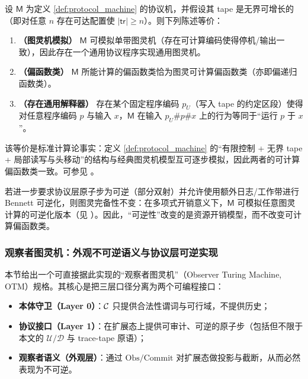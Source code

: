 \begin{theorem}[协议机与图灵机的函数类等价]\label{thm:protocol_machine_equiv_tm}
设 \(\mathsf{M}\) 为定义 \ref{def:protocol_machine} 的协议机，并假设其 tape 是无界可增长的（即对任意 \(n\) 存在可达配置使 \(|\mathsf{tr}|\ge n\)）。则下列陈述等价：
\begin{enumerate}
  \item \textbf{（图灵机模拟）} \(\mathsf{M}\) 可模拟单带图灵机（存在可计算编码使得停机/输出一致），因此存在一个通用协议程序实现通用图灵机。
  \item \textbf{（偏函数类）} \(\mathsf{M}\) 所能计算的偏函数类恰为图灵可计算偏函数类（亦即偏递归函数类）。
  \item \textbf{（存在通用解释器）} 存在某个固定程序编码 \(p_U\)（写入 tape 的约定区段）使得对任意程序编码 \(p\) 与输入 \(x\)，\(\mathsf{M}\) 在输入 \(p_U\#p\#x\) 上的行为等同于“运行 \(p\) 于 \(x\)”。
\end{enumerate}
该等价是标准计算论事实：定义 \ref{def:protocol_machine} 的“有限控制 + 无界 tape + 局部读写与头移动”的结构与经典图灵机模型互可逐步模拟，因此两者的可计算偏函数类一致。可参见 \cite{Sipser2012,Rogers1967}。
\end{theorem}

\begin{corollary}[可逆约束下的图灵完备性]\label{cor:reversible_tm_emergence}
若进一步要求协议层原子步为可逆（部分双射）并允许使用额外日志/工作带进行 Bennett 可逆化，则图灵完备性不变：在多项式开销意义下，\(\mathsf{M}\) 可模拟任意图灵计算的可逆化版本（见 \cite{Bennett1973,Toffoli1980}）。因此，“可逆性”改变的是资源开销模型，而不改变可计算偏函数类。
\end{corollary}

\subsubsection{观察者图灵机：外观不可逆语义与协议层可逆实现}\label{subsubsec:observer_tm_spec}
本节给出一个可直接据此实现的“观察者图灵机”（Observer Turing Machine, OTM）规格。其核心是把三层口径分离为两个可编程接口：
\begin{itemize}
  \item \textbf{本体守卫（Layer 0）}：\(\mathcal{C}\) 只提供合法性谓词与可行域，不提供历史；
  \item \textbf{协议接口（Layer 1）}：在扩展态上提供可审计、可逆的原子步（包括但不限于本文的 \(\mathcal U/\mathcal D\) 与 trace-tape 原语）；
  \item \textbf{观察者语义（外观层）}：通过 \(\mathrm{Obs}/\mathrm{Commit}\) 对扩展态做投影与截断，从而必然表现为不可逆。
\end{itemize}

